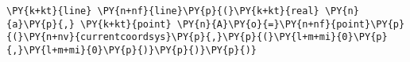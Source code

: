 \begin{Verbatim}[commandchars=\\\{\}]
    \PY{k+kt}{line} \PY{n+nf}{line}\PY{p}{(}\PY{k+kt}{real} \PY{n}{a}\PY{p}{,} \PY{k+kt}{point} \PY{n}{A}\PY{o}{=}\PY{n+nf}{point}\PY{p}{(}\PY{n+nv}{currentcoordsys}\PY{p}{,}\PY{p}{(}\PY{l+m+mi}{0}\PY{p}{,}\PY{l+m+mi}{0}\PY{p}{)}\PY{p}{)}\PY{p}{)}
\end{Verbatim}

